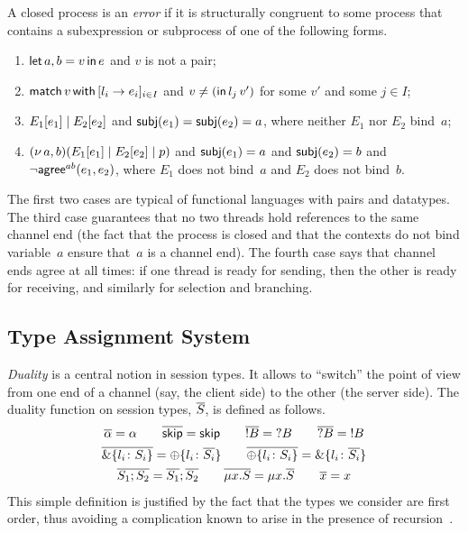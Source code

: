 A closed process is an \emph{error} if it is structurally congruent to
some process that contains a subexpression or subprocess of one of the
following forms.
%
\begin{enumerate}
\item $\mathsf{let}\,{a,b}={v}\,\mathsf{in}\,{e}$ and $v$ is not a pair;
\item $\mathsf{match}\,{v}\,\mathsf{with}\,[{l_i\rightarrow e_i}]_{i\in I}$ and
  $v\ne(\mathsf{in}\,l_j\,v')$ for some $v'$ and some $j\in I$;
\item $E_1[e_1] \mid E_2[e_2]$ and $\mathsf{subj}(e_1) = \mathsf{subj}(e_2) = a$, where
  neither $E_1$ nor $E_2$ bind~$a$;
\item $(\nu\,{a},b)(E_1[e_1] \mid E_2[e_2] \mid p)$ and $\mathsf{subj}(e_1)=a$
  and $\mathsf{subj}(e_2)=b$ and $\neg\mathsf{agree}^{ab}(e_1,e_2)$, where $E_1$ does not
  bind~$a$ and $E_2$ does not bind~$b$.
\end{enumerate}

The first two cases are typical of functional languages with pairs and
datatypes.
%
The third case guarantees that no two threads hold references to the
same channel end (the fact that the process is closed and that the
contexts do not bind variable~$a$ ensure that~$a$ is a channel end).
%
The fourth case says that channel ends agree at all times: if one
thread is ready for sending, then the other is ready for receiving,
and similarly for selection and branching.

\subsection{Type Assignment System}


\emph{Duality} is a central notion in session types. It allows to
``switch'' the point of view from one end of a channel (say, the
client side) to the other (the server side).
%
The duality function on session types, $\overline{S}$, is defined as
follows.
%
\begin{gather*}
  \overline{\alpha} = \alpha 
  \qquad
  \overline{\mathsf{skip}} = \mathsf{skip}
  \qquad
  \overline{!B} = \;?B
  \qquad
  \overline{?B} = \;!B
  \\
  \overline{\&\{l_i\colon S_i\}} = \oplus\{l_i\colon \overline{S_i}\}
  \qquad
  \overline{\oplus\{l_i\colon S_i\}} = \&\{l_i\colon \overline{S_i}\}
  \\
  \overline{S_1;S_2} = \overline{S_1};\overline{S_2}
  \qquad
  \overline{\mu x.S} = \mu x.\overline{S}
  \qquad
  \overline{x} = x
\end{gather*}
%
This simple definition is justified by the fact that the types we
consider are first order, thus avoiding a complication known to arise
in the presence of
recursion~\cite{bernardi.hennessy:using-contracts-model-session-types}.

